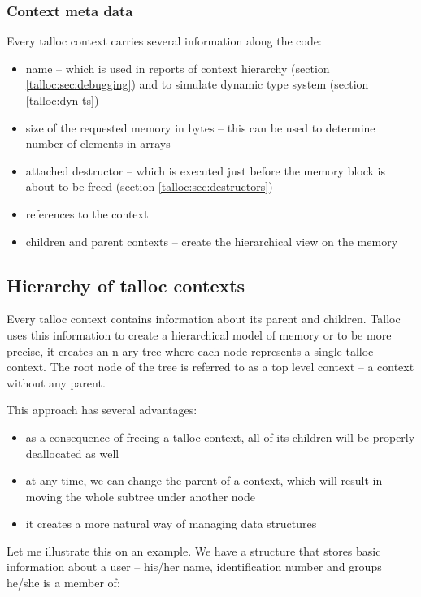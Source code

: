 \subsubsection{Context meta data}
Every talloc context carries several information along the code:

\begin{itemize}
  \item name -- which is used in reports of context hierarchy (section
  \ref{talloc:sec:debugging}) and to simulate dynamic type system (section
  \ref{talloc:dyn-ts})
  \item size of the requested memory in bytes -- this can be used to determine
  number of elements in arrays
  \item attached destructor -- which is executed just before the memory block is
  about to be freed (section \ref{talloc:sec:destructors})
  \item references to the context
  \item children and parent contexts -- create the hierarchical view on the
  memory
\end{itemize}

\subsection{Hierarchy of talloc contexts}

Every talloc context contains information about its parent and children. Talloc
uses this information to create a hierarchical model of memory or to be more
precise, it creates an n-ary tree where each node represents a single talloc
context. The root node of the tree is referred to as a top level context -- a
context without any parent.

This approach has several advantages:

\begin{itemize}
  \item as a consequence of freeing a talloc context, all of its children
  will be properly deallocated as well
  \item at any time, we can change the parent of a context, which
  will result in moving the whole subtree under another node
  \item it creates a more natural way of managing data structures
\end{itemize}

Let me illustrate this on an example. We have a structure that stores basic
information about a user -- his/her name, identification number and groups
he/she is a member of:

